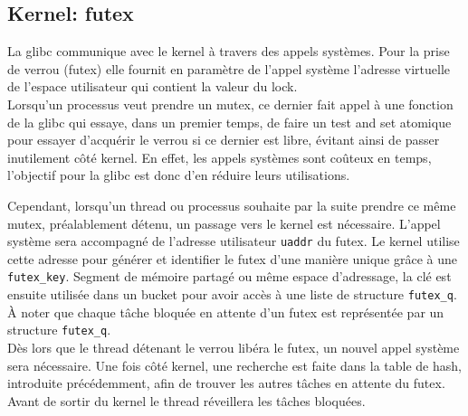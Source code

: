 \subsection{Kernel: futex}

La glibc communique avec le kernel à travers des appels systèmes. Pour la prise de verrou (futex) elle fournit en paramètre de l'appel système l'adresse virtuelle de l'espace utilisateur qui contient la valeur du lock.
\\

Lorsqu'un processus veut prendre un mutex, ce dernier fait appel à une fonction 
de la glibc qui essaye, dans un premier temps, de faire un test and set atomique pour essayer d'acquérir le verrou si ce dernier est libre, évitant ainsi de passer inutilement côté kernel. En effet, les appels systèmes sont coûteux en temps, l'objectif pour la glibc est donc d'en réduire leurs utilisations. 

Cependant, lorsqu'un thread ou processus souhaite par la suite prendre ce même mutex, préalablement détenu, un passage vers le kernel est nécessaire. L'appel système sera accompagné de l'adresse utilisateur \verb|uaddr| du futex. Le kernel utilise cette adresse pour générer et identifier le futex d'une manière unique grâce à une \verb|futex_key|. Segment de mémoire partagé ou même espace d'adressage, la clé est ensuite utilisée dans un bucket pour avoir accès à une liste de structure \verb|futex_q|. À noter que chaque tâche bloquée en attente d'un futex est représentée par un structure \verb|futex_q|.
\\

Dès lors que le thread détenant le verrou libéra le futex, un nouvel appel système sera nécessaire. Une fois côté kernel, une recherche est faite dans la table de hash, introduite précédemment, afin de trouver les autres tâches en attente du futex. Avant de sortir du kernel le thread réveillera les tâches bloquées.


